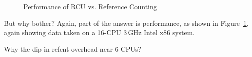\begin{figure}[tb]
\centering
{}
\caption{Performance of RCU vs. Reference Counting}
\label{fig:defer:Performance of RCU vs. Reference Counting}
\end{figure}

But why bother?
Again, part of the answer is performance, as shown in
Figure~\ref{fig:defer:Performance of RCU vs. Reference Counting},
again showing data taken on a 16-CPU 3\,GHz Intel x86 system.

\QuickQuiz{}
	Why the dip in refcnt overhead near 6 CPUs?
 \QuickQuizEnd

